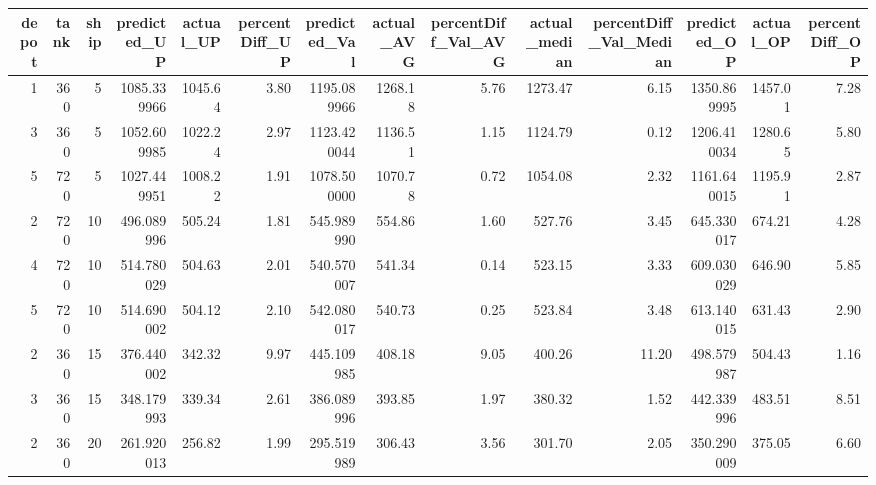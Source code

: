 \begin{tabular}{rrrrrrrrrrrrrr}
\toprule
 depot &  tank &  ship &  predicted\_UP &  actual\_UP &  percentDiff\_UP &  predicted\_Val &  actual\_AVG &  percentDiff\_Val\_AVG &  actual\_median &  percentDiff\_Val\_Median &  predicted\_OP &  actual\_OP &  percentDiff\_OP \\
\midrule
     1 &   360 &     5 &   1085.339966 &    1045.64 &            3.80 &    1195.089966 &     1268.18 &                 5.76 &        1273.47 &                    6.15 &   1350.869995 &    1457.01 &            7.28 \\
     3 &   360 &     5 &   1052.609985 &    1022.24 &            2.97 &    1123.420044 &     1136.51 &                 1.15 &        1124.79 &                    0.12 &   1206.410034 &    1280.65 &            5.80 \\
     5 &   720 &     5 &   1027.449951 &    1008.22 &            1.91 &    1078.500000 &     1070.78 &                 0.72 &        1054.08 &                    2.32 &   1161.640015 &    1195.91 &            2.87 \\
     2 &   720 &    10 &    496.089996 &     505.24 &            1.81 &     545.989990 &      554.86 &                 1.60 &         527.76 &                    3.45 &    645.330017 &     674.21 &            4.28 \\
     4 &   720 &    10 &    514.780029 &     504.63 &            2.01 &     540.570007 &      541.34 &                 0.14 &         523.15 &                    3.33 &    609.030029 &     646.90 &            5.85 \\
     5 &   720 &    10 &    514.690002 &     504.12 &            2.10 &     542.080017 &      540.73 &                 0.25 &         523.84 &                    3.48 &    613.140015 &     631.43 &            2.90 \\
     2 &   360 &    15 &    376.440002 &     342.32 &            9.97 &     445.109985 &      408.18 &                 9.05 &         400.26 &                   11.20 &    498.579987 &     504.43 &            1.16 \\
     3 &   360 &    15 &    348.179993 &     339.34 &            2.61 &     386.089996 &      393.85 &                 1.97 &         380.32 &                    1.52 &    442.339996 &     483.51 &            8.51 \\
     2 &   360 &    20 &    261.920013 &     256.82 &            1.99 &     295.519989 &      306.43 &                 3.56 &         301.70 &                    2.05 &    350.290009 &     375.05 &            6.60 \\

\end{tabular}
